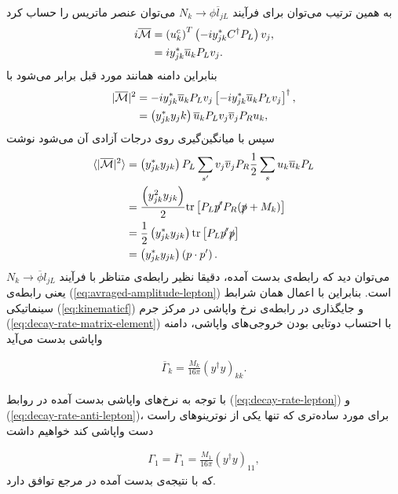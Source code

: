 \documentclass[a4paper]{book}
\begin{document}
به همین ترتیب می‌توان برای فرآیند {\footnotesize$N_k \to \phi \overline{l}_{jL}$} ‌‌می‌توان عنصر ماتریس را حساب کرد
{\footnotesize\begin{align}
	i\overline{\mathcal{M}}&=\left(u_k^c\right)^T \left(-i y^*_{jk} C^{\dagger} P_L\right) v_j,\notag\\
	&=i y_{jk}^* \overline{u}_k P_L v_j.
	\label{eq:matrix-element-anti-fermion}
\end{align}}
بنابراین دامنه همانند مورد قبل برابر می‌شود با
{\footnotesize\begin{align}
	|\overline{\mathcal{M}}|^2&=-i y_{jk}^* \overline{u}_k P_L v_j \left[-i y_{jk}^* \overline{u}_k P_L v_j\right]^{\dagger},\notag\\
	&=\left(y_{jk}^* y_jk\right) \overline{u}_k P_L v_j \overline{v}_j P_R u_k,
\end{align}}
سپس با میانگین‌گیری روی درجات آزادی آن می‌شود نوشت
{\footnotesize\begin{align}
	\langle|\overline{\mathcal{M}}|^2\rangle&=\left(y_{jk}^* y_{jk}\right) P_L \sum_{s'} v_j \overline{v}_j P_R \frac{1}{2} \sum_{s} u_k \overline{u}_k P_L\notag\\
	&=\frac{\left(y_{jk}^2 y_{jk}\right)}{2} {\rm tr}\left[P_L \slashed{p'} P_R (\slashed{p}+M_k)\right]\notag\\
	&=\frac{1}{2}\left(y_{jk}^* y_{jk}\right) {\rm tr}\left[P_L\slashed{p'}\slashed{p}\right]\notag\\
	&=\left(y_{jk}^* y_{jk}\right) \left(p \cdot p'\right).
	\label{eq:avraged-amplitude-anti-lepton}
\end{align}}
می‌توان دید که رابطه‌ی بدست آمده، دقیقا نظیر رابطه‌ی متناظر با فرآیند {\footnotesize$N_k \to \overline{\phi} l_{jL}$} یعنی رابطه‌ی (\ref{eq:avraged-amplitude-lepton}) است. بنابراین با اعمال همان شرابط سینماتیکی (\ref{eq:kinematicf}) و جایگذاری در رابطه‌ی نرخ واپاشی در مرکز جرم (\ref{eq:decay-rate-matrix-element}) با احتساب دوتایی بودن خروجی‌های واپاشی، دامنه واپاشی بدست می‌آید
\par
\vspace{-0.5cm}
{\footnotesize\begin{align}
	\overline{\Gamma}_k =\frac{M_k}{16 \pi} \left(y^{\dagger} y\right)_{kk}.
	\label{eq:decay-rate-anti-lepton}
\end{align}}

با توجه به نرخ‌های واپاشی بدست آمده در روابط (\ref{eq:decay-rate-lepton}) و (\ref{eq:decay-rate-anti-lepton})، برای مورد ساده‌تری که تنها یکی از نوترینوهای راست دست واپاشی کند خواهیم داشت
\par
\vspace{-0.5cm}
{\footnotesize\begin{align}
	\Gamma_1=\overline{\Gamma}_1 =\frac{M_1}{16 \pi} \left(y^{\dagger} y\right)_{11},
	\label{eq:decay-rate}
\end{align}}
که با نتیجه‌ی بدست آمده در مرجع \cite{Luty:1992un} توافق دارد.
\end{document}
